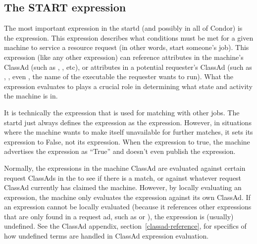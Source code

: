 \subsection{\label{sec:Start-Expr}
The START expression}

The most important expression in the startd (and possibly in all of
Condor) is the  expression.  
This expression describes what conditions must be met for a given
machine to service a resource request (in other words, start someone's
job). 
This expression (like any other expression) can reference attributes
in the machine's ClassAd (such as , ,
etc), or attributes in a potential requester's ClassAd (such as
, , even , the name of the
executable the requester wants to run).
What the  expression evaluates to plays a crucial role in
determining what state and activity the machine is in.

It is technically the  expression that is used for
matching with other jobs.  The startd just always defines the
 expression as the  expression.
However, in situations where the machine wants to make itself
unavailable for further matches, it sets its 
expression to False, not its  expression.  
When the  expression  to true, the
machine advertises the  expression as ``True'' and
doesn't even publish the  expression.

Normally, the expressions in the machine ClassAd are evaluated against
certain request ClassAds in the  to see if there is
a match, or against whatever request ClassAd currently has claimed the
machine.  However, by locally evaluating an expression, the machine only
evaluates the expression against its own ClassAd.  If an expression
cannot be locally evaluated (because it references other expressions
that are only found in a request ad, such as  or
), the expression is (usually) undefined.  See the
ClassAd appendix, section~\ref{classad-reference}, for specifics of
how undefined terms are handled in ClassAd expression evaluation. 

